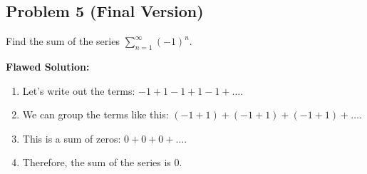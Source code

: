 \documentclass{article}
\begin{document}
\subsection*{Problem 5 (Final Version)}
Find the sum of the series $\sum_{n=1}^{\infty} (-1)^n$.

\textbf{Flawed Solution:}
\begin{enumerate}
    \item Let's write out the terms: $-1 + 1 - 1 + 1 - 1 + \dots$.
    \item We can group the terms like this: $(-1 + 1) + (-1 + 1) + (-1 + 1) + \dots$.
    \item This is a sum of zeros: $0 + 0 + 0 + \dots$.
    \item Therefore, the sum of the series is 0.
\end{enumerate}
\end{document}
